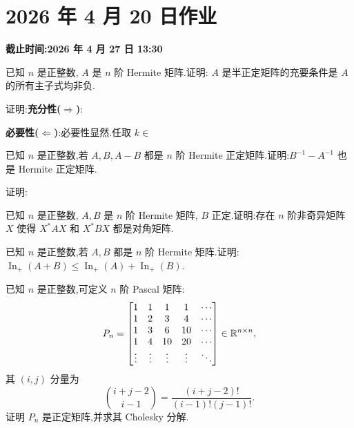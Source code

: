 \section*{2026 年 4 月 20 日作业}
{}
\noindent\textbf{截止时间:2026 年 4 月 27 日 13:30}
\setcounter{problem}{0}
\setcounter{sollemma}{0}

\begin{problem}
已知 $n$ 是正整数, $A$ 是 $n$ 阶 Hermite 矩阵.证明: $A$ 是半正定矩阵的充要条件是 $A$ 的所有主子式均非负.
\begin{solution}
    证明:\textbf{充分性($\Rightarrow$)}:

    \textbf{必要性($\Leftarrow$)}:必要性显然.任取 $k \in $
\end{solution}
\end{problem}

\begin{problem}
已知 $n$ 是正整数,若 $A,B,A-B$ 都是 $n$ 阶 Hermite 正定矩阵.证明:$B^{-1}-A^{-1}$ 也是 Hermite 正定矩阵.
\begin{solution}
    证明:
\end{solution}
\end{problem}

\begin{problem}
已知 $n$ 是正整数, $A,B$ 是 $n$ 阶 Hermite 矩阵, $B$ 正定.证明:存在 $n$ 阶非奇异矩阵 $X$ 使得 $X^*AX$ 和 $X^*BX$ 都是对角矩阵.
\begin{solution}
\end{solution}
\end{problem}

\begin{problem}
已知 $n$ 是正整数,若 $A,B$ 都是 $n$ 阶 Hermite 矩阵.证明: $\operatorname{In}_{+}(A+B)\le \operatorname{In}_{+}(A)+\operatorname{In}_{+}(B)$.
\begin{solution}

\end{solution}
\end{problem}

\begin{problem}
已知 $n$ 是正整数,可定义 $n$ 阶 Pascal 矩阵:
\[
    P_n=
    \begin{bmatrix}
        1 & 1 & 1 & 1 & \cdots \\
        1 & 2 & 3 & 4 & \cdots \\
        1 & 3 & 6 & 10 & \cdots \\
        1 & 4 & 10 & 20 & \cdots \\
        \vdots & \vdots & \vdots & \vdots & \ddots
    \end{bmatrix}
    \in\mathbb{R}^{n\times n},
\]
其 $(i,j)$ 分量为
\[
    \binom{i+j-2}{i-1}
    =
    \frac{(i+j-2)!}{(i-1)!(j-1)!}.
\]
证明 $P_n$ 是正定矩阵,并求其 Cholesky 分解.
\begin{solution}

\end{solution}
\end{problem}

